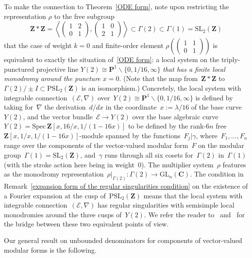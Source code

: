 \documentclass[10pt]{amsart}
\def\PSL{\mathrm{PSL}}
\renewcommand\setminus{\smallsetminus}
\def\spec{\mathrm{Spec} \,}
\def\Z{\mathbf{Z}}
\def\GL{\mathrm{GL}}
\renewcommand\mathbb{\mathbf}
\theoremstyle{remark}
\numberwithin{equation}{subsection}
\def\C{\mathbf{C}}
\def\SL{\mathrm{SL}}
\begin{document}
To make the connection to Theorem~\ref{ODE form}, note upon restricting the representation $\rho$ to the free subgroup 
$$\Z \ast \Z 
= \left< 
  \begin{pmatrix}  1 & 2 \\ 0 & 1 \end{pmatrix},  \begin{pmatrix}  1 & 0 \\ 2 & 1 \end{pmatrix}  \right>
\subset \Gamma(2) \subset \Gamma(1) =\SL_2(\Z)$$
 that
the case of weight $k = 0$ and finite-order element $\rho \left( \begin{pmatrix}  1 & 1 \\ 0 & 1 \end{pmatrix} \right)$  is equivalent to exactly the situation of~\ref{ODE form}: a local system on the triply-punctured projective line $Y(2) \cong \mathbb{P}^1 \setminus \{0, 1/16, \infty\}$ \emph{that has a finite local monodromy  around the puncture $x = 0$}.
(Note that the map from~$\Z \ast \Z$ to~$\Gamma(2)/\pm I \subset \PSL_2(\Z)$ is an isomorphism.) Concretely, the local system with integrable connection~$(\mathcal{E}, \nabla)$ over~$Y(2) \cong \mathbb{P}^1 \setminus \{0,1/16, \infty\}$ is defined by taking for~$\nabla$ the derivation~$d/dx$ in the coordinate~$x := \lambda/16$ of the base curve~$Y(2)$, and the vector bundle~$\mathcal{E} \to Y(2)$  over the base algebraic curve~$Y(2) = \spec \Z[ x, 16/x, 1/(1-16x) ]$ to be defined by the  rank-$6n$ free $\Z[x,1/x,1/(1-16x)]$-module spanned by the functions~$F_j | \gamma$, where~$F_1, \ldots,F_n$ range over the components of the vector-valued modular form~$F$ on the modular group~$\Gamma(1) = \SL_2(\Z)$, and~$\gamma$ runs through all six cosets for~$\Gamma(2)$ in~$\Gamma(1)$ (with the stroke action here being in weight~$0$). The multiplier system~$\rho$ features as the monodromy representation~$\rho|_{\Gamma(2)} : \Gamma(2) \to \GL_n(\C)$. The condition in Remark~\ref{expansion form of the regular singularities condition} on the existence of a Fourier expansion at the cusp of~$\PSL_2(\Z)$ means that the local system with integrable connection~$(\mathcal{E},\nabla)$ has regular singularities with semisimple local monodromies around the three cusps of~$Y(2)$. 
 We refer the reader to~\cite{BantayGannon} and~\cite{GannonVVMF} for the bridge between these two equivalent points of view. 

Our general result on unbounded denominators for components of vector-valued modular forms is the following. 
\end{document}
